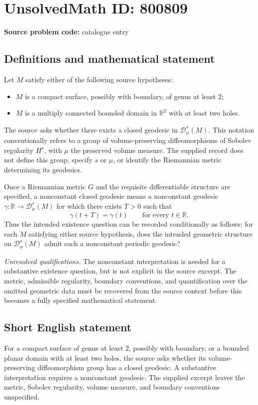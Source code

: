 \documentclass[11pt]{article}
\newcommand{\R}{\mathbb{R}}
\begin{document}
\section*{UnsolvedMath ID: 800809}
\textbf{Source problem code:} catalogue entry
\subsection{Definitions and mathematical statement}
Let \(M\) satisfy either of the following source hypotheses:
\begin{itemize}
\item \(M\) is a compact surface, possibly with boundary, of genus at least \(2\);
\item \(M\) is a multiply connected bounded domain in \(\R^2\) with at least two holes.
\end{itemize}
The source asks whether there exists a closed geodesic in \(\mathscr{D}^s_\mu(M)\). This notation conventionally refers to a group of volume-preserving diffeomorphisms of Sobolev regularity \(H^s\), with \(\mu\) the preserved volume measure. The supplied record does not define this group, specify \(s\) or \(\mu\), or identify the Riemannian metric determining its geodesics.

Once a Riemannian metric \(G\) and the requisite differentiable structure are specified, a nonconstant closed geodesic means a nonconstant geodesic \(\gamma\colon\R\to\mathscr{D}^s_\mu(M)\) for which there exists \(T>0\) such that
\[
\gamma(t+T)=\gamma(t)\qquad\text{for every }t\in\R.
\]
Thus the intended existence question can be recorded conditionally as follows: for each \(M\) satisfying either source hypothesis, does the intended geometric structure on \(\mathscr{D}^s_\mu(M)\) admit such a nonconstant periodic geodesic?

\emph{Unresolved qualifications.} The nonconstant interpretation is needed for a substantive existence question, but is not explicit in the source excerpt. The metric, admissible regularity, boundary conventions, and quantification over the omitted geometric data must be recovered from the source context before this becomes a fully specified mathematical statement.
\subsection{Short English statement}
For a compact surface of genus at least \(2\), possibly with boundary, or a bounded planar domain with at least two holes, the source asks whether its volume-preserving diffeomorphism group has a closed geodesic. A substantive interpretation requires a nonconstant geodesic. The supplied excerpt leaves the metric, Sobolev regularity, volume measure, and boundary conventions unspecified.
\end{document}
